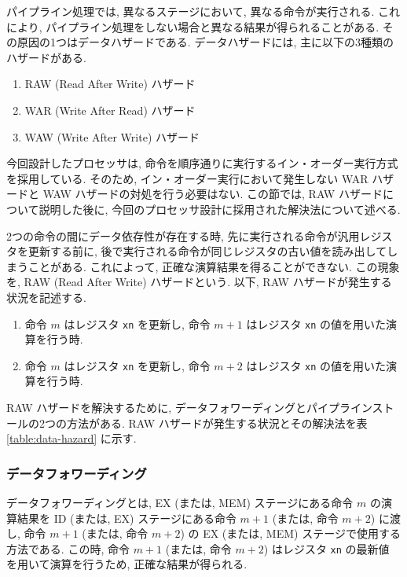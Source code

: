 \documentclass[../specifications.tex]{subfiles}
\begin{document}
  パイプライン処理では, 異なるステージにおいて, 異なる命令が実行される.
  これにより, パイプライン処理をしない場合と異なる結果が得られることがある.
  その原因の1つはデータハザードである.
  データハザードには, 主に以下の3種類のハザードがある.
  \begin{enumerate}
    \item RAW (Read After Write) ハザード
    \item WAR (Write After Read) ハザード
    \item WAW (Write After Write) ハザード
  \end{enumerate}
  今回設計したプロセッサは, 命令を順序通りに実行するイン・オーダー実行方式を採用している.
  そのため, イン・オーダー実行において発生しない WAR ハザードと WAW ハザードの対処を行う必要はない.
  この節では, RAW ハザードについて説明した後に, 
  今回のプロセッサ設計に採用された解決法について述べる.

  2つの命令の間にデータ依存性が存在する時, 
  先に実行される命令が汎用レジスタを更新する前に, 
  後で実行される命令が同じレジスタの古い値を読み出してしまうことがある.
  これによって, 正確な演算結果を得ることができない.
  この現象を, RAW (Read After Write) ハザードという.
  以下, RAW ハザードが発生する状況を記述する.

  \begin{enumerate}
    \item 命令 $m$ はレジスタ \verb|xn| を更新し, 
    命令 $m+1$ はレジスタ \verb|xn| の値を用いた演算を行う時.

    \item 命令 $m$ はレジスタ \verb|xn| を更新し, 
    命令 $m+2$ はレジスタ \verb|xn| の値を用いた演算を行う時.
  \end{enumerate}

  RAW ハザードを解決するために, データフォワーディングとパイプラインストールの2つの方法がある.
  RAW ハザードが発生する状況とその解決法を表 \ref{table:data-hazard} に示す.

  \subsubsection{データフォワーディング}
  データフォワーディングとは, EX (または, MEM) ステージにある命令 $m$ の演算結果を
  ID (または, EX) ステージにある命令 $m+1$ (または, 命令 $m+2$) に渡し, 
  命令 $m+1$ (または, 命令 $m+2$) の EX (または, MEM) ステージで使用する方法である.
  この時, 命令 $m+1$ (または, 命令 $m+2$) はレジスタ \verb|xn| の最新値
  を用いて演算を行うため, 正確な結果が得られる.
\end{document}
